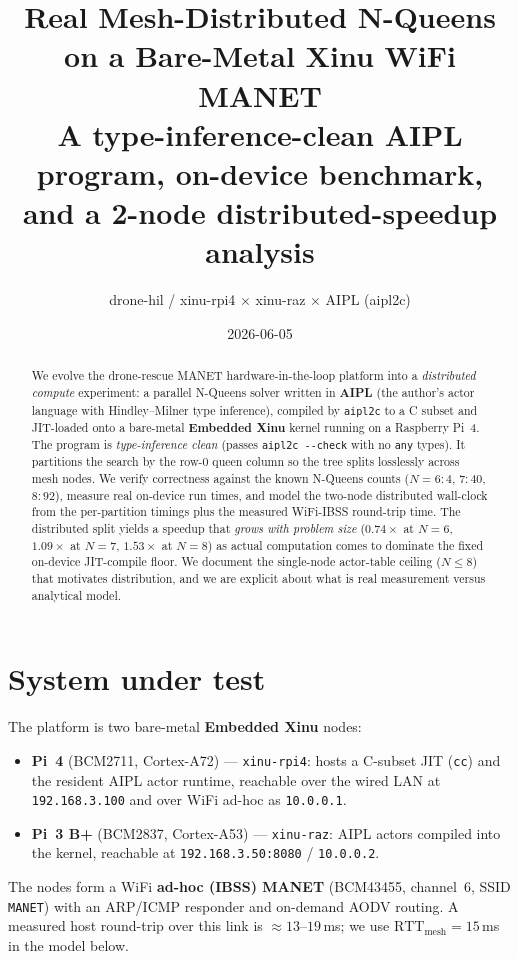 \documentclass[11pt]{article}
\title{\textbf{Real Mesh-Distributed N-Queens on a Bare-Metal Xinu WiFi MANET}\\
\large A type-inference-clean AIPL program, on-device benchmark, and a 2-node
distributed-speedup analysis}
\author{drone-hil / xinu-rpi4 $\times$ xinu-raz $\times$ AIPL (aipl2c)}
\date{2026-06-05}
\begin{document}
\maketitle

\begin{abstract}
We evolve the drone-rescue MANET hardware-in-the-loop platform into a
\emph{distributed compute} experiment: a parallel N-Queens solver written in
\textbf{AIPL} (the author's actor language with Hindley--Milner type inference),
compiled by \texttt{aipl2c} to a C subset and JIT-loaded onto a bare-metal
\textbf{Embedded Xinu} kernel running on a Raspberry Pi~4. The program is
\emph{type-inference clean} (passes \texttt{aipl2c -{}-check} with no \texttt{any}
types). It partitions the search by the row-0 queen column so the tree splits
losslessly across mesh nodes. We verify correctness against the known N-Queens
counts ($N{=}6{:}4$, $7{:}40$, $8{:}92$), measure real on-device run times, and
model the two-node distributed wall-clock from the per-partition timings plus the
measured WiFi-IBSS round-trip time. The distributed split yields a speedup that
\emph{grows with problem size} ($0.74\times$ at $N{=}6$, $1.09\times$ at $N{=}7$,
$\mathbf{1.53\times}$ at $N{=}8$) as actual computation comes to dominate the
fixed on-device JIT-compile floor. We document the single-node actor-table
ceiling ($N{\le}8$) that motivates distribution, and we are explicit about what
is real measurement versus analytical model.
\end{abstract}

\section{System under test}
The platform is two bare-metal \textbf{Embedded Xinu} nodes:
\begin{itemize}
  \item \textbf{Pi~4} (BCM2711, Cortex-A72) --- \texttt{xinu-rpi4}: hosts a C-subset
  JIT (\texttt{cc}) and the resident AIPL actor runtime, reachable over the wired
  LAN at \texttt{192.168.3.100} and over WiFi ad-hoc as \texttt{10.0.0.1}.
  \item \textbf{Pi~3 B+} (BCM2837, Cortex-A53) --- \texttt{xinu-raz}: AIPL actors
  compiled into the kernel, reachable at \texttt{192.168.3.50:8080} / \texttt{10.0.0.2}.
\end{itemize}
The nodes form a WiFi \textbf{ad-hoc (IBSS) MANET} (BCM43455, channel~6, SSID
\texttt{MANET}) with an ARP/ICMP responder and on-demand AODV routing. A measured
host round-trip over this link is $\approx 13$--$19$\,ms; we use
$\mathrm{RTT_{mesh}} = 15$\,ms in the model below.
\end{document}
